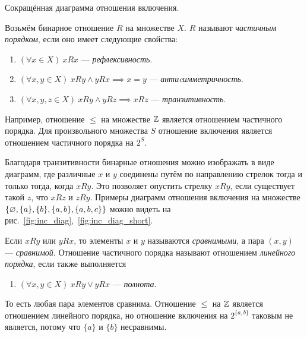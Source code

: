 \begin{marginfigure}
  \center

  \caption{Сокращённая диаграмма отношения включения.}\label{fig:inc_diag_short}
\end{marginfigure}

Возьмём бинарное отношение $R$ на множестве $X$. $R$ называют
{\it частичным порядком},
если оно имеет следующие свойства:
\begin{enumerate}
  \item{}$(\forall x\in X)~xRx$ --- {\it рефлексивность}.
  \item{}$(\forall x,y\in X)~xRy\land yRx\implies x=y$
  --- {\it антиcимметричность}.
  \item{}$(\forall x,y,z\in X)~xRy\land yRz\implies xRz$
  --- {\it транзитивность}.
\end{enumerate}
Например, отношение $\leq$ на множестве $\mathbb Z$ является отношением частичного порядка.
Для произвольного множества $S$ отношение включения является
отношением частичного порядка на $2^{S}$.

Благодаря транзитивности бинарные отношения можно изображать в виде диаграмм, где
различные $x$ и $y$ соединены путём по направлению стрелок тогда и только
тогда, когда $xRy$.
Это позволяет опустить стрелку $xRy$, если существует такой $z$, что $xRz$ и $zRy$.
Примеры диаграмм отношения включения на множестве
$\{\varnothing,\{a\},\{b\},\{a,b\}, \{a,b,c\}\}$
можно видеть на рис.~\ref{fig:inc_diag},~\ref{fig:inc_diag_short}.

Если $xRy$ или $yRx$, то элементы $x$ и $y$ называются
{\it сравнимыми}, а пара $(x,y)$ --- {\it сравнимой}.
Отношение частичного порядка называют
отношением {\it линейного порядка}, если также выполняется
\begin{enumerate}[resume*]
  \item{}$(\forall x,y\in X)~xRy\lor yRx$ --- {\it полнота}.
\end{enumerate}
То есть любая пара элементов сравнима. Отношение $\leq$ на $\mathbb Z$
является отношением линейного порядка,
но отношение включения на $2^{\{a,b\}}$ таковым не является,
потому что $\{a\}$ и $\{b\}$ несравнимы.

